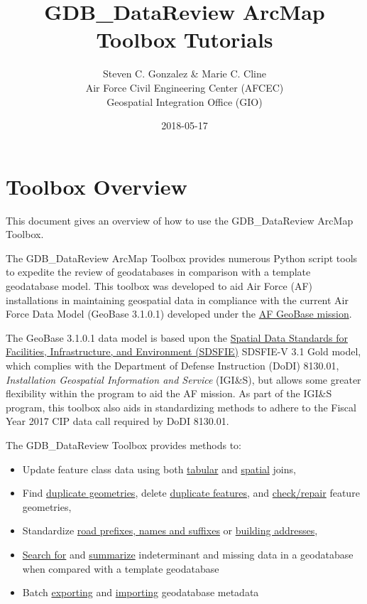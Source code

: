 \documentclass[openany]{book}
\title{GDB\_DataReview ArcMap Toolbox Tutorials}
\author{Steven C. Gonzalez \& Marie C. Cline \\ Air Force Civil Engineering Center (AFCEC) \\ Geospatial Integration Office (GIO)}
\date{2018-05-17}
\providecommand{\tightlist}{%
  \setlength{\itemsep}{0pt}\setlength{\parskip}{0pt}}
\theoremstyle{definition}
\theoremstyle{definition}
\theoremstyle{definition}
\theoremstyle{remark}
\begin{document}
\maketitle

{
\setcounter{tocdepth}{0}
\tableofcontents
}
\chapter{Toolbox Overview}\label{overview}

This document gives an overview of how to use the GDB\_DataReview ArcMap
Toolbox.

The GDB\_DataReview ArcMap Toolbox provides numerous Python script tools
to expedite the review of geodatabases in comparison with a template
geodatabase model. This toolbox was developed to aid Air Force (AF)
installations in maintaining geospatial data in compliance with the
current Air Force Data Model (GeoBase 3.1.0.1) developed under the
\href{https://www.sdsfieonline.org/Components/USAF}{AF GeoBase mission}.

The GeoBase 3.1.0.1 data model is based upon the
\href{https://www.sdsfieonline.org/}{Spatial Data Standards for
Facilities, Infrastructure, and Environment (SDSFIE)} SDSFIE-V 3.1 Gold
model, which complies with the Department of Defense Instruction (DoDI)
8130.01, \emph{Installation Geospatial Information and Service}
(IGI\&S), but allows some greater flexibility within the program to aid
the AF mission. As part of the IGI\&S program, this toolbox also aids in
standardizing methods to adhere to the Fiscal Year 2017 CIP data call
required by DoDI 8130.01.

The GDB\_DataReview Toolbox provides methods to:

\begin{itemize}
\tightlist
\item
  Update feature class data using both
  \protect\hyperlink{joinCalc}{tabular} and
  \protect\hyperlink{spatjoinCalc}{spatial} joins,
\item
  Find \protect\hyperlink{dupGeom}{duplicate geometries}, delete
  \protect\hyperlink{dupFeats}{duplicate features}, and
  \protect\hyperlink{chkGeom}{check/repair} feature geometries,
\item
  Standardize \protect\hyperlink{std3}{road prefixes, names and
  suffixes} or \protect\hyperlink{stdAdd1}{building addresses},
\item
  \protect\hyperlink{indtSearch}{Search for} and
  \protect\hyperlink{summIndt}{summarize} indeterminant and missing data
  in a geodatabase when compared with a template geodatabase
\item
  Batch \protect\hyperlink{exMeta}{exporting} and
  \protect\hyperlink{imMeta}{importing} geodatabase metadata
\end{itemize}
\end{document}
